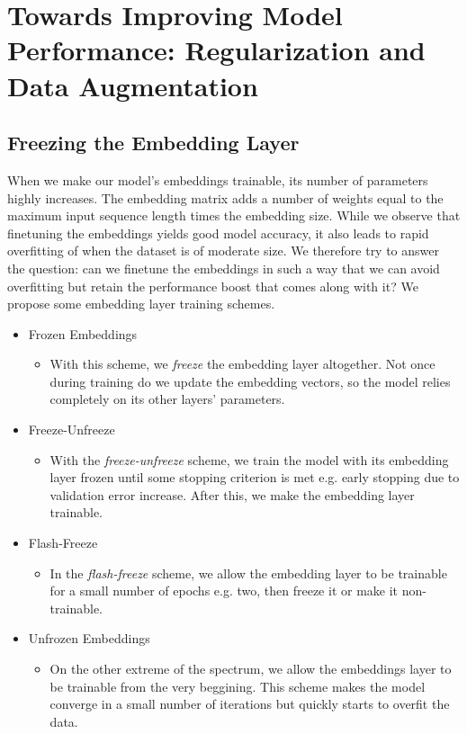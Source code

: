 
\chapter{Towards Improving Model Performance: Regularization and Data Augmentation}

\section{Freezing the Embedding Layer}
When we make our model's embeddings trainable, its number of parameters highly increases. The embedding matrix
adds a number of weights equal to the maximum input sequence length times the embedding size.
While we observe that finetuning the embeddings yields good model accuracy, it also leads to rapid overfitting
of when the dataset is of moderate size. We therefore try to answer the question: can we finetune the embeddings
in such a way that we can avoid overfitting but retain the performance boost that comes along with it?
We propose some embedding layer training schemes.

\begin{itemize}
  \item{Frozen Embeddings}
  \begin{itemize}
    \item{With this scheme, we \textit{freeze} the embedding layer altogether. Not once during training do we update
    the embedding vectors, so the model relies completely on its other layers' parameters.}
  \end{itemize}
  \item{Freeze-Unfreeze}
  \begin{itemize}
    \item{With the \textit{freeze-unfreeze} scheme, we train the model with its embedding layer frozen until some
    stopping criterion is met e.g. early stopping due to validation error increase. After this, we make the
    embedding layer trainable.}
  \end{itemize}
  \item{Flash-Freeze}
  \begin{itemize}
    \item{In the \textit{flash-freeze} scheme, we allow the embedding layer to be trainable for a small number of
    epochs e.g. two, then freeze it or make it non-trainable.}
  \end{itemize}
  \item{Unfrozen Embeddings}
  \begin{itemize}
    \item{On the other extreme of the spectrum, we allow the embeddings layer to be trainable from the very beggining.
    This scheme makes the model converge in a small number of iterations but quickly starts to overfit the data.}
  \end{itemize}
\end{itemize}

